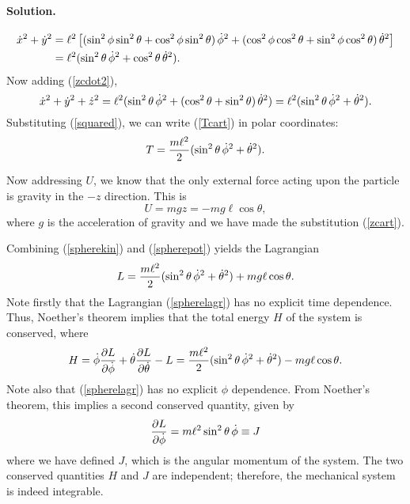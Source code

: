 \documentclass[11pt]{article}
\newcommand{\refeq}[1]{(\ref{#1})}
\newenvironment{solution}
{
    \paragraph{Solution.}
    \ignorespaces
}
{
    \bigskip
}
\begin{document}
\begin{solution}
	\begin{align}
		\dot{x}^2 + \dot{y}^2 &= \ell^2 \left[ (\sin^2{\phi} \sin^2{\theta} + \cos^2{\phi} \sin^2{\theta}) \,\dot{\phi}^2 + (\cos^2{\phi} \cos^2{\theta} + \sin^2{\phi} \cos^2{\theta}) \,\dot{\theta}^2 \right] \\
		&= \ell^2 (\sin^2{\theta} \,\dot{\phi}^2 + \cos^2{\theta} \,\dot{\theta}^2).
	\end{align}
	Now adding \refeq{zcdot2},
	\begin{equation}
		\dot{x}^2 + \dot{y}^2 + \dot{z}^2 = \ell^2 (\sin^2{\theta} \,\dot{\phi}^2 + (\cos^2{\theta} + \sin^2{\theta}) \,\dot{\theta}^2) = \ell^2 (\sin^2{\theta} \,\dot{\phi}^2 + \dot{\theta}^2). \label{sqaured}
	\end{equation}
	Substituting \refeq{squared}, we can write \refeq{Tcart} in polar coordinates:
	\begin{equation} \label{spherekin}
		T = \frac{m \ell^2}{2} (\sin^2{\theta} \,\dot{\phi}^2 + \dot{\theta}^2).
	\end{equation}
	
	Now addressing $U$, we know that the only external force acting upon the particle is gravity in the $-z$ direction.  This is
	\begin{equation} \label{spherepot}
		U = m g z = - m g \ell \cos{\theta},
	\end{equation}
	where $g$ is the acceleration of gravity and we have made the substitution \refeq{zcart}.
	
	Combining \refeq{spherekin} and \refeq{spherepot} yields the Lagrangian
	\begin{equation} \label{spherelagr}
		L = \frac{m \ell^2}{2} (\sin^2{\theta} \,\dot{\phi}^2 + \dot{\theta}^2) + m g \ell \cos{\theta}.
	\end{equation}
	Note firstly that the Lagrangian \refeq{spherelagr} has no explicit time dependence.  Thus, Noether's theorem implies that the total energy $H$ of the system is conserved, where
	\begin{equation} \label{consH}
		H = \dot{\phi} \pdv{L}{\dot{\phi}} + \dot{\theta} \pdv{L}{\dot{\theta}} - L = \frac{m \ell^2}{2} (\sin^2{\theta} \,\dot{\phi}^2 + \dot{\theta}^2) - m g \ell \cos{\theta}.
	\end{equation}
	Note also that \refeq{spherelagr} has no explicit $\phi$ dependence.  From Noether's theorem, this implies a second conserved quantity, given by
	\begin{equation} \label{consH}
		\pdv{L}{\dot{\phi}} = m \ell^2 \sin^2{\theta} \,\dot{\phi} \equiv J
	\end{equation}
	where we have defined $J$, which is the angular momentum of the system.  The two conserved quantities $H$ and $J$ are independent; therefore, the mechanical system is indeed integrable.
\end{solution}
\end{document}
